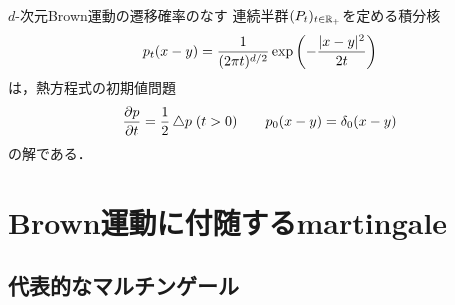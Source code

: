 \documentclass[uplatex,dvipdfmx]{jsreport}
\begin{document}
\begin{proposition}[Brown運動の遷移半群が満たす偏微分方程式]
    $d$-次元Brown運動の遷移確率のなす
    連続半群$(P_t)_{t\in\mathbb{R}_+}$を定める積分核
    \[p_t(x-y)=\frac{1}{(2\pi t)^{d/2}}\exp\left(-\frac{\lvert x-y\rvert^2}{2t}\right)\]
    は，熱方程式の初期値問題
    \[\frac{\partial p}{\partial t}=\frac{1}{2}\mathop{}\!\mathbin\bigtriangleup p\;(t>0)\qquad p_0(x-y)=\delta_0(x-y)\]
    の解である．
\end{proposition}

\section{Brown運動に付随するmartingale}

\subsection{代表的なマルチンゲール}
\end{document}

